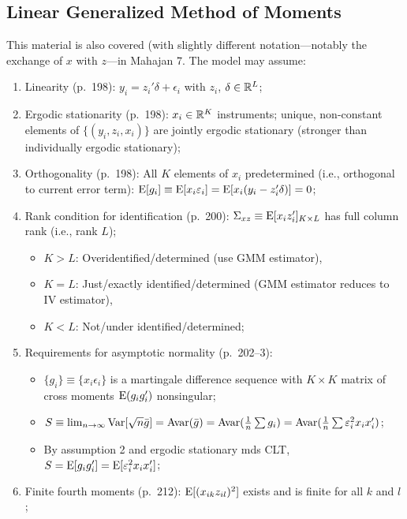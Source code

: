 \documentclass[8pt,letterpaper, landscape]{extarticle} %
\begin{document}
\begin{multicols}{3}
\begin{description}
\subsection{Linear Generalized Method of Moments}
This material is also covered (with slightly different notation---notably the exchange of $ x $ with $ z $---in Mahajan 7.
 The model may assume:
\begin{enumerate}
\item Linearity (p.~198): $ y_i = z_i' \delta + \epsilon_i $ with $ z_i $, $ \delta \in \mathbb{R}^L $;
\item Ergodic stationarity (p.~198): $ x_i \in \mathbb{R}^K $ instruments; unique, non-constant elements of $ \{ (y_i, z_i, x_i) \} $ are jointly ergodic stationary (stronger than individually ergodic stationary);
\item Orthogonality (p.~198): All $ K $ elements of $ x_i $ predetermined (i.e., orthogonal to current error term): $ \operatorname{E} [g_i] \equiv \operatorname{E} [x_i \varepsilon_i] = \operatorname{E} [x_i (y_i - z_i' \delta)] = 0  $;
\item Rank condition for identification (p.~200): $ \Sigma_{xz} \equiv \operatorname{E} [x_i z_i']_{K \times L} $ has full column rank (i.e., rank $ L $);
\begin{itemize}
\item $ K>L $: Overidentified/determined (use GMM estimator),
\item $ K=L $: Just/exactly identified/determined (GMM estimator reduces to IV estimator),
\item $ K<L $: Not/under identified/determined;
\end{itemize}
\item Requirements for asymptotic normality (p.~202--3):
\begin{itemize}
\item $ \{ g_i \} \equiv \{ x_i \epsilon_i \} $ is a martingale difference sequence with $ K \times K $ matrix of cross moments $ \operatorname{E} (g_i g_i' ) $ nonsingular;
\item $ S \equiv \lim_{n \to \infty} \operatorname{Var} [\sqrt{n} \bar{g}] = \operatorname{Avar} (\bar{g}) = \operatorname{Avar} (\tfrac{1}{n} \sum g_i) = \operatorname{Avar} (\tfrac{1}{n} \sum \varepsilon_i^{2} x_i x_i') $;
\item By assumption 2 and ergodic stationary mds CLT, $ S = \operatorname{E} [g_i g_i'] = \operatorname{E} [\varepsilon_i^{2} x_i x_i'] $;
\end{itemize}
\item Finite fourth moments (p.~212): $ \operatorname{E} [(x_{ik} z_{il})^{2}] $ exists and is finite for all $ k $ and $ l $;

\end{enumerate}
\end{description}
\end{multicols}
\end{document}
